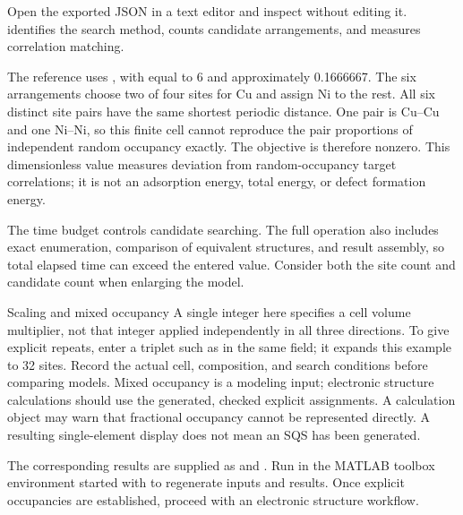 Open the exported JSON in a text editor and inspect  without editing it.  identifies the search method,  counts candidate arrangements, and  measures correlation matching.

The reference uses , with  equal to 6 and  approximately 0.1666667. The six arrangements choose two of four sites for Cu and assign Ni to the rest. All six distinct site pairs have the same shortest periodic distance. One pair is Cu--Cu and one Ni--Ni, so this finite cell cannot reproduce the pair proportions of independent random occupancy exactly. The objective is therefore nonzero. This dimensionless value measures deviation from random-occupancy target correlations; it is not an adsorption energy, total energy, or defect formation energy.

The time budget controls candidate searching. The full operation also includes exact enumeration, comparison of equivalent structures, and result assembly, so total elapsed time can exceed the entered value. Consider both the site count and candidate count when enlarging the model.

\begin{notebox}{Scaling and mixed occupancy}
A single integer here specifies a cell volume multiplier, not that integer applied independently in all three directions. To give explicit repeats, enter a triplet such as  in the same field; it expands this example to 32 sites. Record the actual cell, composition, and search conditions before comparing models. Mixed occupancy is a modeling input; electronic structure calculations should use the generated, checked explicit assignments. A calculation object may warn that fractional occupancy cannot be represented directly. A resulting single-element display does not mean an SQS has been generated.
\end{notebox}

The corresponding results are supplied as  and . Run  in the MATLAB\regmark{} toolbox environment started with  to regenerate inputs and results. Once explicit occupancies are established, proceed with an electronic structure workflow.
